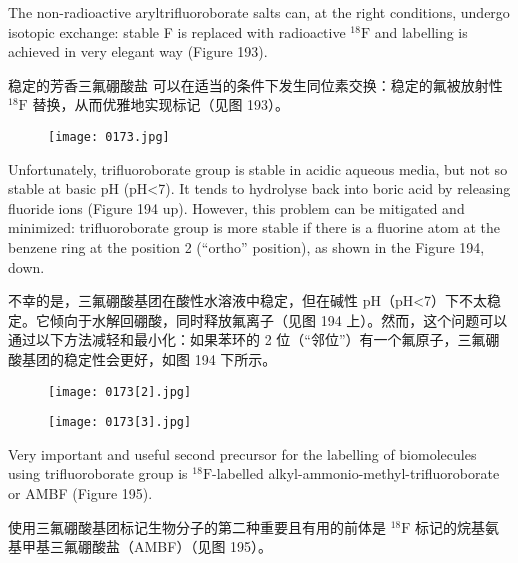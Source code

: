 \documentclass[dvipsnames, svgnames,a4paper,11pt]{article}
\begin{document}
The non-radioactive aryltrifluoroborate salts \ce{[R-Ar-BF3]-} can, at the right conditions,
undergo isotopic exchange: stable F is replaced with radioactive ${}^\mathrm{18}\mathrm{F}$ and labelling is
achieved in very elegant way (Figure 193).

稳定的芳香三氟硼酸盐 \ce{[R-Ar-BF3]-} 可以在适当的条件下发生同位素交换：稳定的氟被放射性 ${}^\mathrm{18}\mathrm{F}$ 替换，从而优雅地实现标记（见图 193）。

\begin{figure}[h]
	\centering
    \texttt{[image: 0173.jpg]}   
     \label{fig193}
\end{figure}


Unfortunately, trifluoroborate group is stable in acidic aqueous media, but not so
stable at basic pH (pH<7). It tends to hydrolyse back into boric acid by releasing
fluoride ions (Figure 194 up). However, this problem can be mitigated and minimized:
trifluoroborate group is more stable if there is a fluorine atom at the benzene ring at
the position 2 (“ortho” position), as shown in the Figure 194, down.

不幸的是，三氟硼酸基团在酸性水溶液中稳定，但在碱性 pH（pH<7）下不太稳定。它倾向于水解回硼酸，同时释放氟离子（见图 194 上）。然而，这个问题可以通过以下方法减轻和最小化：如果苯环的 2 位（“邻位”）有一个氟原子，三氟硼酸基团的稳定性会更好，如图 194 下所示。

\begin{figure}[h]
	\centering
    \texttt{[image: 0173[2].jpg]}   
     \label{fig194}
\end{figure}

\begin{figure}[h]
	\centering
    \texttt{[image: 0173[3].jpg]}   
     \label{fig195}
\end{figure}
Very important and useful second precursor for the labelling of biomolecules using
trifluoroborate group is ${}^\mathrm{18}\mathrm{F}$-labelled alkyl-ammonio-methyl-trifluoroborate or AMBF
(Figure 195).


使用三氟硼酸基团标记生物分子的第二种重要且有用的前体是 ${}^\mathrm{18}\mathrm{F}$ 标记的烷基氨基甲基三氟硼酸盐（AMBF）（见图 195）。
\end{document}
